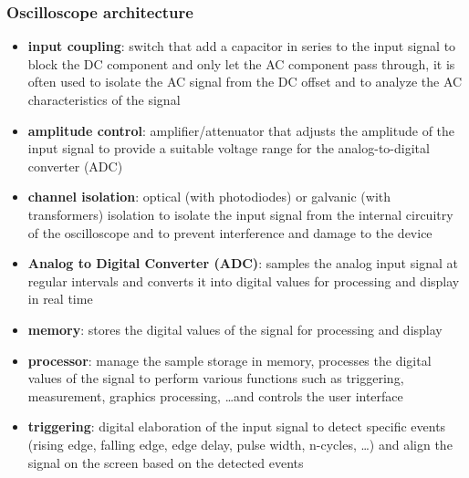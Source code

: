 \subsubsection*{Oscilloscope architecture}
\begin{itemize}
	\item \textbf{input coupling}: switch that add a capacitor in series to the input signal to block the DC component and only
	let the AC component pass through, it is often used to isolate the AC signal from the DC offset and to analyze the AC
	characteristics of the signal
	\item \textbf{amplitude control}: amplifier/attenuator that adjusts the amplitude of the input signal to provide a
	suitable voltage range for the analog-to-digital converter (ADC)
	\item \textbf{channel isolation}: optical (with photodiodes) or galvanic (with transformers) isolation to isolate the input
	signal from the internal circuitry of the oscilloscope and to prevent interference and damage to the device
	\item \textbf{Analog to Digital Converter (ADC)}: samples the analog input signal at regular intervals and converts it into
	digital values for processing and display in real time
	\item \textbf{memory}: stores the digital values of the signal for processing and display
	\item \textbf{processor}: manage the sample storage in memory, processes the digital values of the signal to perform various
	functions such as triggering, measurement, graphics processing, \dots and controls the user interface
	\item \textbf{triggering}: digital elaboration of the input signal to detect specific events (rising edge, falling edge,
	edge delay, pulse width, n-cycles, \dots) and align the signal on the screen based on the detected events
\end{itemize}

